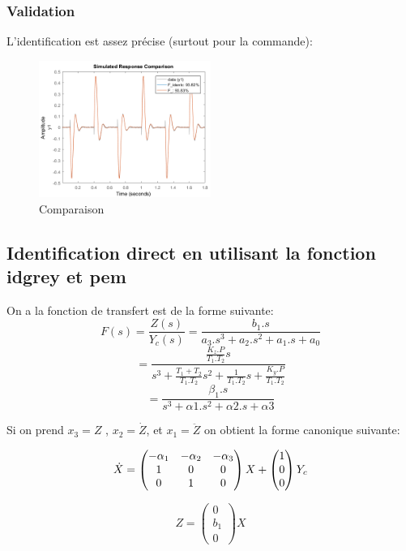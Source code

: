 \documentclass[twoside,twocolumn]{article}
\begin{document}
  \subsubsection{Validation}
  L'identification est assez précise (surtout pour la commande):

\begin{figure}[H]
\centering
\includegraphics[width=0.5\textwidth]{Images/16.png}
\caption{Comparaison}
\end{figure}

\subsection{Identification direct en utilisant la fonction idgrey et pem}
On a la fonction de transfert est de la forme suivante:
$$F(s)=\frac{Z(s)}{Y_c(s)} = \frac{b_1.s}{a_3.s^3 + a_2.s^2 + a_1.s + a_0}$$ 
$$ = \frac{\frac{K_z.P}{T_1.T_2} s}{s^3 + \frac{T_1+T_2}{T_1.T_2}s^2 + \frac{1}{T_1.T_2}s + \frac{K_y.P}{T_1.T_2}}$$ 
$$ = \frac{\beta_1.s}{s^3 + \alpha1.s^2 + \alpha2.s + \alpha3}$$ 

Si on prend $x_3 = Z$ , $x_2 = \dot Z$, et $x_1 = \ddot Z$ 
on obtient la forme canonique suivante:

\begin{equation}
\dot{X}=
\begin{pmatrix}  -\alpha_1 & -\alpha_2 & -\alpha_3 \\ 1 & 0 & 0\\ 0 & 1 & 0 \end{pmatrix}X
+\begin{pmatrix} 1 \\ 0 \\ 0 \end{pmatrix} Y_c \\
\end{equation}

\begin{equation}
Z  = \begin{pmatrix} 0 \\ b_1 \\ 0 \end{pmatrix}X
\end{equation}
\end{document}
